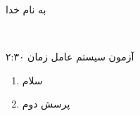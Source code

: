 \documentclass[11pt, a4paper]{article}
\author{Ahmad Yoosofan}
\date{\today}
\begin{document}
\begin{nastaliq}
\centerline{به نام خدا}
\end{nastaliq}
\\
\centerline{آزمون 
سیستم عامل
زمان ۲:۳۰  
}
\begin{enumerate}
\item
سلام
\item
پرسش دوم
\end{enumerate}
\end{document}
